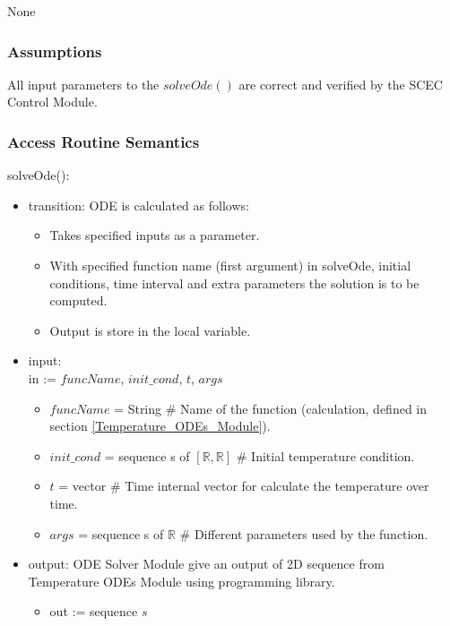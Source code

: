 \documentclass[12pt, titlepage]{article}
\begin{document}
None

\subsubsection{Assumptions}

All input parameters to the $solveOde()$ are correct and verified by the SCEC Control Module. 

\subsubsection{Access Routine Semantics}

\noindent solveOde():
\begin{itemize}
\item transition: ODE is calculated as follows: 
\begin{itemize}
    \item Takes specified inputs as a parameter. 
    \item With specified function name (first argument) in solveOde, initial conditions, time interval and extra parameters the solution is to be computed. 
    \item Output is store in the local variable. 
\end{itemize}

\item input: \\ 
in := $funcName$, $init\_cond$, $t$, $args$  
\begin{itemize}
    \item $funcName$ = String \# Name of the function (calculation, defined in section \ref{Temperature_ODEs_Module}).  
    \item $init\_cond$ = sequence s of $[\mathbb{R}, \mathbb{R}]$ \# Initial temperature condition. 
    \item $t$ = vector \# Time internal vector for calculate the temperature over time.  
    \item $args$ = sequence s of $\mathbb{R}$ \# Different parameters used by the function. 
\end{itemize}

\item output: ODE Solver Module give an output of 2D sequence from Temperature ODEs Module using programming library. 
\begin{itemize}
    \item out := sequence $s$ 
\end{itemize}


\end{itemize}
\end{document}
